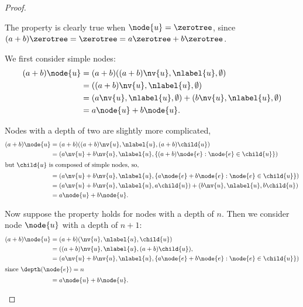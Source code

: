 \begin{proposition}
\begin{proof}
\begin{description}
      The property is clearly true when \(\node{u} = \zerotree\),
      since \((a+b)\zerotree = \zerotree = a\zerotree+b\zerotree\).

      We first consider simple nodes:
      \begin{align*}
        (a + b)\node{u} &= (a + b) ((a + b)\nv{u}, \nlabel{u}, \emptyset) \\
        &= ((a + b)\nv{u}, \nlabel{u}, \emptyset) \\
        &= (a\nv{u}, \nlabel{u}, \emptyset) + (b  \nv{u}, \nlabel{u}, \emptyset) \\
        &= a \node{u} + b \node{u}.
      \end{align*}

      Nodes with a depth of two are slightly more complicated, 
      \begin{align*}
          (a + b)\node{u} &= (a + b) ((a + b)\nv{u}, \nlabel{u}, (a + b)\child{u}) \\
          &= (a\nv{u} + b  \nv{u}, \nlabel{u}, \{(a + b)\node{e}:\node{e}\in\child{u}\}) \\
          \intertext{but \(\child{u}\) is composed of simple nodes, so,}
          &= (a\nv{u} + b  \nv{u}, \nlabel{u}, \{a \node{e} + b \node{e}:\node{e}\in\child{u}\}) \\
          &= (a\nv{u} + b  \nv{u}, \nlabel{u}, a\child{u}) + (b  \nv{u}, \nlabel{u}, b\child{u}) \\
          &= a \node{u} + b \node{u}.
      \end{align*}

      
      Now suppose the property holds for nodes with a depth of \(n\).
      Then we consider node \(\node{u}\) with a depth of \(n+1\):
      \begin{align*}
          (a + b)\node{u} &= (a + b) (\nv{u}, \nlabel{u}, \child{u}) \\
          &= ((a + b)\nv{u}, \nlabel{u}, (a + b)\child{u}), \\
          &= (a\nv{u} + b  \nv{u}, \nlabel{u}, \{a \node{e} + b \node{e}:\node{e}\in\child{u}\}) \\
        \intertext{since \(\depth(\node{e}) = n\)}
          &= a \node{u} + b \node{u}.
      \end{align*}


\end{description}
\end{proof}
\end{proposition}
